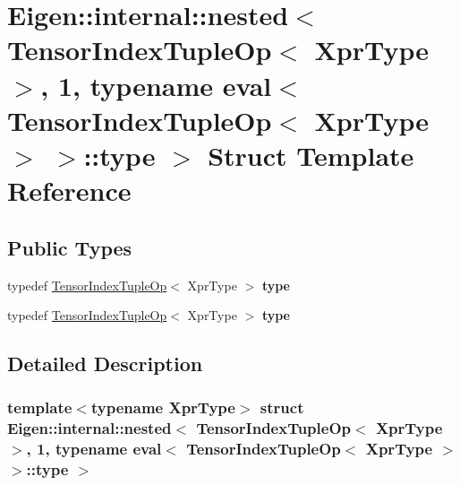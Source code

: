 \hypertarget{struct_eigen_1_1internal_1_1nested_3_01_tensor_index_tuple_op_3_01_xpr_type_01_4_00_011_00_01typ5b5b3f337e89a8fcbdd9fda09242c5e4}{}\section{Eigen\+:\+:internal\+:\+:nested$<$ Tensor\+Index\+Tuple\+Op$<$ Xpr\+Type $>$, 1, typename eval$<$ Tensor\+Index\+Tuple\+Op$<$ Xpr\+Type $>$ $>$\+:\+:type $>$ Struct Template Reference}
\label{struct_eigen_1_1internal_1_1nested_3_01_tensor_index_tuple_op_3_01_xpr_type_01_4_00_011_00_01typ5b5b3f337e89a8fcbdd9fda09242c5e4}
\subsection*{Public Types}
\begin{DoxyCompactItemize}
\item 
\mbox{\label{struct_eigen_1_1internal_1_1nested_3_01_tensor_index_tuple_op_3_01_xpr_type_01_4_00_011_00_01typ5b5b3f337e89a8fcbdd9fda09242c5e4_a9a86af0f6cb1da4f44cdc4a1dcf72d2e}} 
typedef \hyperlink{class_eigen_1_1_tensor_index_tuple_op}{Tensor\+Index\+Tuple\+Op}$<$ Xpr\+Type $>$ {\bfseries type}
\item 
\mbox{\label{struct_eigen_1_1internal_1_1nested_3_01_tensor_index_tuple_op_3_01_xpr_type_01_4_00_011_00_01typ5b5b3f337e89a8fcbdd9fda09242c5e4_a9a86af0f6cb1da4f44cdc4a1dcf72d2e}} 
typedef \hyperlink{class_eigen_1_1_tensor_index_tuple_op}{Tensor\+Index\+Tuple\+Op}$<$ Xpr\+Type $>$ {\bfseries type}
\end{DoxyCompactItemize}


\subsection{Detailed Description}
\subsubsection*{template$<$typename Xpr\+Type$>$\newline
struct Eigen\+::internal\+::nested$<$ Tensor\+Index\+Tuple\+Op$<$ Xpr\+Type $>$, 1, typename eval$<$ Tensor\+Index\+Tuple\+Op$<$ Xpr\+Type $>$ $>$\+::type $>$}



